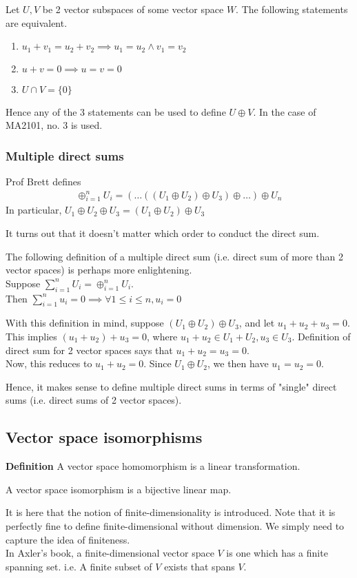 \documentclass{article}
\begin{document}
Let $U, V$ be 2 vector subspaces of some vector space $W$.
The following statements are equivalent.
\begin{enumerate}
	\item $u_1 + v_1 = u_2 + v_2 \implies u_1=u_2 \land v_1=v_2$
	\item $u + v = 0\implies u=v=0$
	\item $U\cap V=\{0\}$
\end{enumerate}
Hence any of the 3 statements can be used to define $U\oplus V$. In the case of MA2101, no. 3 is used.

\subsubsection{Multiple direct sums}
Prof Brett defines
\begin{align*}
	\oplus_{i=1}^n U_i = (\dots((U_1 \oplus U_2)\oplus U_3) \oplus \dots)\oplus U_n
\end{align*}
In particular, $U_1 \oplus U_2\oplus U_3=(U_1 \oplus U_2)\oplus U_3$

It turns out that it doesn't matter which order to conduct the direct sum.

The following definition of a multiple direct sum (i.e. direct sum of more than 2 vector spaces) is perhaps more enlightening.\\
Suppose $\sum_{i=1}^n U_i = \oplus_{i=1}^n U_i$.\\
Then $\sum_{i=1}^n u_i=0\implies \forall 1\leq i\leq n, u_i=0$

With this definition in mind, suppose $(U_1 \oplus U_2)\oplus U_3$, and let $u_1 + u_2 + u_3 = 0$. This implies $(u_1 + u_2) + u_3 = 0$, where $u_1+u_2\in U_1+U_2, u_3\in U_3$. Definition of direct sum for 2 vector spaces says that $u_1+u_2=u_3=0$.\\
Now, this reduces to $u_1+u_2=0$. Since $U_1 \oplus U_2$, we then have $u_1=u_2=0$.

Hence, it makes sense to define multiple direct sums in terms of "single" direct sums (i.e. direct sums of 2 vector spaces).

\subsection{Vector space isomorphisms}
\textbf{Definition} A vector space homomorphism is a linear transformation.

A vector space isomorphism is a bijective linear map.

It is here that the notion of finite-dimensionality is introduced. Note that it is perfectly fine to define finite-dimensional without dimension. We simply need to capture the idea of finiteness.\\
In Axler's book, a finite-dimensional vector space $V$ is one which has a finite spanning set. i.e. A finite subset of $V$ exists that spans $V$.
\end{document}
